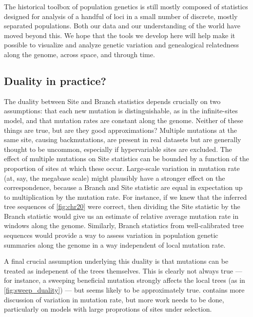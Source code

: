 \documentclass{article}
\begin{document}
The historical toolbox of population genetics
is still mostly composed of statistics designed for analysis of a handful of loci
in a small number of discrete, mostly separated populations.
Both our data and our understanding of the world have moved beyond this.
We hope that the tools we develop here will help make it possible
to visualize and analyze genetic variation and genealogical relatedness
along the genome, across space, and through time.

\subsection*{Duality in practice?}

The duality between Site and Branch statistics depends crucially on two assumptions:
that each new mutation is distinguishable, as in the infinite-sites model,
and that mutation rates are constant along the genome.
Neither of these things are true, but are they good approximations?
Multiple mutations at the same site, causing backmutations,
are present in real datasets but are generally thought to be uncommon,
especially if hypervariable sites are excluded.
The effect of multiple mutations on Site statistics
can be bounded by a function of the proportion of sites at which these occur.
Large-scale variation in mutation rate (at, say, the megabase scale)
might plausibly have a stronger effect on the correspondence,
because a Branch and Site statistic are equal in expectation up to multiplication by the mutation rate.
For instance, if we knew that the inferred tree sequences of \autoref{fig:chr20} were correct,
then dividing the Site statistic by the Branch statistic
would give us an estimate of relative average mutation rate in windows along the genome.
Similarly, Branch statistics from well-calibrated tree sequences
would provide a way to assess variation in population genetic summaries along the genome
in a way independent of local mutation rate.

A final crucial assumption underlying this duality is that mutations can be treated
as indepenent of the trees themselves.
This is clearly not always true --- for instance,
a sweeping beneficial mutation strongly affects the local trees (as in \autoref{fig:sweep_duality}) ---
but seems likely to be approximately true.
\citet{ralph2019empirical} contains more discussion of variation in mutation rate,
but more work needs to be done, particularly on models with large proprotions of sites under selection.
\end{document}
